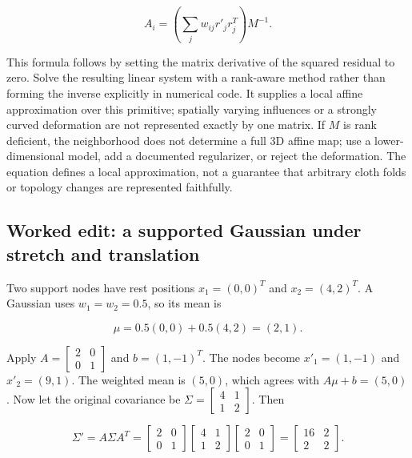 \[
A_i=\left(\sum_jw_{ij}r'_jr_j^T\right)M^{-1}.
\]

This formula follows by setting the matrix derivative of the squared residual to zero. Solve the resulting linear system with a rank-aware method rather than forming the inverse explicitly in numerical code. It supplies a local affine approximation over this primitive; spatially varying influences or a strongly curved deformation are not represented exactly by one matrix. If \(M\) is rank deficient, the neighborhood does not determine a full 3D affine map; use a lower-dimensional model, add a documented regularizer, or reject the deformation. The equation defines a local approximation, not a guarantee that arbitrary cloth folds or topology changes are represented faithfully.

\subsection{Worked edit: a supported Gaussian under stretch and translation}\label{04-visual-computing-ii-ch039-worked-edit-a-supported-gaussian-under-stretch-and-translation}

\hypertarget{04-visual-computing-ii-ch039-worked-edit-a-supported-gaussian-under-stretch-and-translation}{}

Two support nodes have rest positions \(x_1=(0,0)^T\) and \(x_2=(4,2)^T\). A Gaussian uses \(w_1=w_2=0.5\), so its mean is

\[
\mu=0.5(0,0)+0.5(4,2)=(2,1).
\]

Apply \(A=\begin{bmatrix}2&0\\0&1\end{bmatrix}\) and \(b=(1,-1)^T\). The nodes become \(x'_1=(1,-1)\) and \(x'_2=(9,1)\). The weighted mean is \((5,0)\), which agrees with \(A\mu+b=(5,0)\). Now let the original covariance be \(\Sigma=\begin{bmatrix}4&1\\1&2\end{bmatrix}\). Then

\[
\Sigma'=A\Sigma A^T=
\begin{bmatrix}2&0\\0&1\end{bmatrix}
\begin{bmatrix}4&1\\1&2\end{bmatrix}
\begin{bmatrix}2&0\\0&1\end{bmatrix}
=
\begin{bmatrix}16&2\\2&2\end{bmatrix}.
\]

